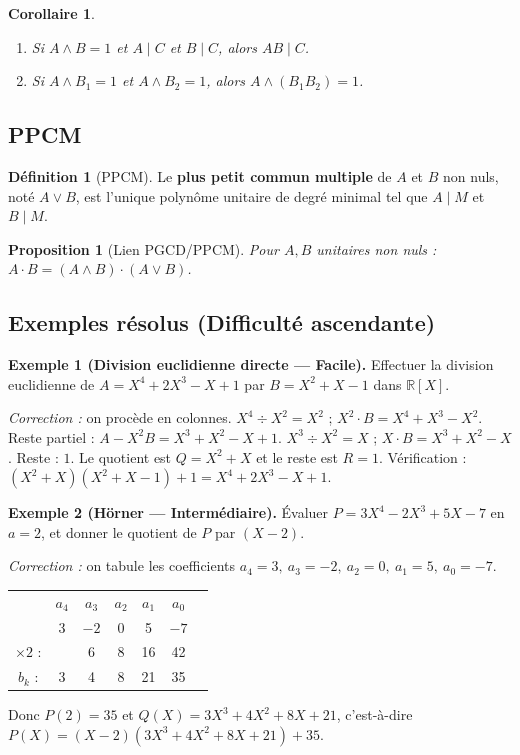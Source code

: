 \documentclass[12pt,a4paper]{report}
\newtheorem{proposition}[theoreme]{Proposition}
\newtheorem{corollaire}[theoreme]{Corollaire}
\theoremstyle{definition}
\newtheorem{definition}{Définition}[section]
\theoremstyle{remark}
\begin{document}
\begin{corollaire}
\begin{enumerate}
    \item Si $A \wedge B = 1$ et $A \mid C$ et $B \mid C$, alors $A B \mid C$.
    \item Si $A \wedge B_1 = 1$ et $A \wedge B_2 = 1$, alors $A \wedge (B_1 B_2) = 1$.
\end{enumerate}
\end{corollaire}

\subsection{PPCM}

\begin{definition}[PPCM]
Le \textbf{plus petit commun multiple} de $A$ et $B$ non nuls, noté $A \vee B$, est l'unique polynôme unitaire de degré minimal tel que $A \mid M$ et $B \mid M$.
\end{definition}

\begin{proposition}[Lien PGCD/PPCM]
Pour $A, B$ unitaires non nuls : $A \cdot B = (A \wedge B) \cdot (A \vee B)$.
\end{proposition}

\subsection{Exemples résolus (Difficulté ascendante)}

\textbf{Exemple 1 (Division euclidienne directe --- Facile).}
Effectuer la division euclidienne de $A = X^4 + 2X^3 - X + 1$ par $B = X^2 + X - 1$ dans $\mathbb{R}[X]$.

\textit{Correction :} on procède en colonnes.
$X^4 \div X^2 = X^2$ ; $X^2 \cdot B = X^4 + X^3 - X^2$. Reste partiel : $A - X^2 B = X^3 + X^2 - X + 1$.
$X^3 \div X^2 = X$ ; $X \cdot B = X^3 + X^2 - X$. Reste : $1$.
Le quotient est $Q = X^2 + X$ et le reste est $R = 1$. Vérification : $(X^2 + X)(X^2 + X - 1) + 1 = X^4 + 2X^3 - X + 1$. \checkmark

\medskip

\textbf{Exemple 2 (Hörner --- Intermédiaire).}
Évaluer $P = 3X^4 - 2X^3 + 5X - 7$ en $a = 2$, et donner le quotient de $P$ par $(X - 2)$.

\textit{Correction :} on tabule les coefficients $a_4 = 3,\ a_3 = -2,\ a_2 = 0,\ a_1 = 5,\ a_0 = -7$.
\begin{center}
\begin{tabular}{c|cccccc}
 & $a_4$ & $a_3$ & $a_2$ & $a_1$ & $a_0$ \\
 & 3 & $-2$ & 0 & 5 & $-7$ \\
\hline
$\times 2$ : & & 6 & 8 & 16 & 42 \\
\hline
$b_k$ : & 3 & 4 & 8 & 21 & 35
\end{tabular}
\end{center}
Donc $P(2) = 35$ et $Q(X) = 3X^3 + 4X^2 + 8X + 21$, c'est-à-dire $P(X) = (X - 2)(3X^3 + 4X^2 + 8X + 21) + 35$.
\end{document}
